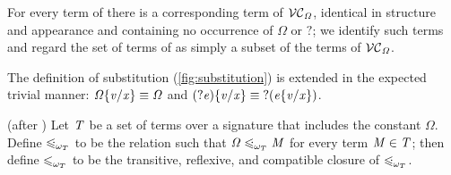 For every term of \versecalc{} there is a corresponding term of $\vcOmega$, identical in structure and appearance and containing no occurrence of \ensuremath{\mathit{\Omega}} or \ensuremath{\mathbin{?}};
we identify such terms and regard the set of terms of \versecalc{} as simply a subset of the terms of $\vcOmega$.

The definition of substitution (\cref{fig:substitution}) is extended in the expected trivial manner: $\ensuremath{\subst{\mathit{\Omega}}{\Varid{x}}{\Varid{v}}} \equiv \ensuremath{\mathit{\Omega}}$ and $\ensuremath{\subst{(\mathbin{?}\Varid{e})}{\Varid{x}}{\Varid{v}}} \equiv \ensuremath{\mathbin{?}(\subst{\Varid{e}}{\Varid{x}}{\Varid{v}})}$.

\begin{definition}
(after \cite[Definition 2.3]{ariola:skew-confluence})
Let \ensuremath{\Conid{T}} be a set of terms over a signature that includes the constant \ensuremath{\mathit{\Omega}}.
Define $\urleqomegaof{T}$ to be the relation such that $\ensuremath{\mathit{\Omega}} \urleqomegaof{T} \ensuremath{\Conid{M}}$ for every term $\ensuremath{\Conid{M}} \in \ensuremath{\Conid{T}}$;
then define $\leqomegaof{T}$ to be the transitive, reflexive, and compatible closure of $\urleqomegaof{T}$.
\end{definition}


